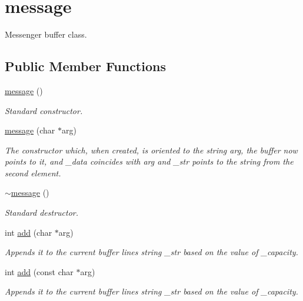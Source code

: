 \hypertarget{classmessage}{}\section{message}
\label{classmessage}


Messenger buffer class.  


\subsection*{Public Member Functions}
\begin{DoxyCompactItemize}
\item 
\hyperlink{classmessage_aba502b8bb024cc38b45756fdf581f915}{message} ()
\begin{DoxyCompactList}\small\item\em Standard constructor. \end{DoxyCompactList}\item 
\hyperlink{classmessage_a3ef1da0ca306b53a28c36153a06b0f7d}{message} (char $\ast$arg)
\begin{DoxyCompactList}\small\item\em The constructor which, when created, is oriented to the string arg, the buffer now points to it, and \+\_\+data coincides with arg and \+\_\+str points to the string from the second element. \end{DoxyCompactList}\item 
\hyperlink{classmessage_ad1e1d5c1974b1842edde5b261015cdde}{$\sim$message} ()
\begin{DoxyCompactList}\small\item\em Standard destructor. \end{DoxyCompactList}\item 
int \hyperlink{classmessage_ade996ea0a39cac012e455bb82c1bd88f}{add} (char $\ast$arg)
\begin{DoxyCompactList}\small\item\em Appends it to the current buffer line\textquotesingle{}s string \+\_\+str based on the value of \+\_\+capacity. \end{DoxyCompactList}\item 
int \hyperlink{classmessage_a86ea56f1017e712e5b721013f1bdfb49}{add} (const char $\ast$arg)
\begin{DoxyCompactList}\small\item\em Appends it to the current buffer line\textquotesingle{}s string \+\_\+str based on the value of \+\_\+capacity. \end{DoxyCompactList}\item 

\end{DoxyCompactItemize}
